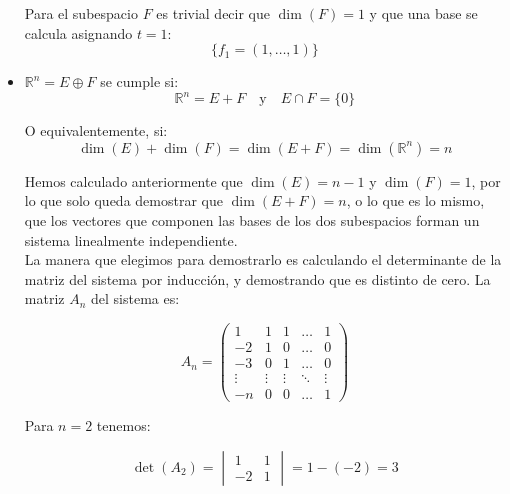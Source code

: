 \begin{itemize}[$\bullet$]
    \vspace{20px}
    Para el subespacio $F$ es trivial decir que $\dim(F) = 1$ y que una base se calcula asignando $t = 1$:
    \begin{equation*}
        \{f_1 = (1, \ldots, 1) \}
    \end{equation*}

    \item $\mathbb{R}^n = E \oplus F$ se cumple si:
    \begin{equation*}
        \mathbb{R}^n = E + F \hspace{12pt} \text{y} \hspace{12pt} E \cap F = \{0\}
    \end{equation*}

    O equivalentemente, si:
    \begin{equation*}
        \dim(E) + \dim(F) = \dim(E+F) = \dim(\mathbb{R}^n ) = n
    \end{equation*}

    Hemos calculado anteriormente que $\dim(E) = n - 1$ y $\dim(F) = 1$, por lo que solo queda demostrar que $\dim(E + F) = n$,
    o lo que es lo mismo,
    que los vectores que componen las bases de los dos subespacios forman un sistema linealmente independiente.\\

    La manera que elegimos para demostrarlo es calculando el determinante de la matriz del sistema por inducción,
    y demostrando que es distinto de cero. La matriz $A_n$ del sistema es:

    \begin{equation*}
        A_n =
        \begin{pmatrix}
            1      & 1      & 1      & \ldots & 1      \\
            -2     & 1      & 0      & \ldots & 0      \\
            -3     & 0      & 1      & \ldots & 0      \\
            \vdots & \vdots & \vdots & \ddots & \vdots \\
            -n     & 0      & 0      & \ldots & 1
        \end{pmatrix}
    \end{equation*}

    Para $n = 2$ tenemos:

    \begin{equation*}
        \det(A_2) =
        \begin{vmatrix}
            1  & 1 \\
            -2 & 1
        \end{vmatrix} = 1 - (-2) = 3
    \end{equation*}


\end{itemize}
